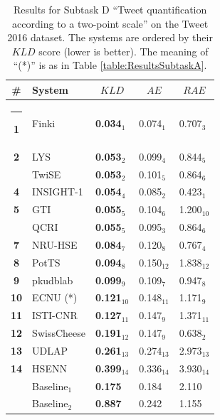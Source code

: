 \documentclass[11pt,letterpaper]{article}
\newif\ifdraft
\newcommand{\fabrizio}[1]{\ifdraft{\textcolor{cyan}{[Fabrizio]: {#1}}}\else{\vspace{0ex}}\fi}
\begin{document}
\begin{table}[tbh]
  \centering
  \begin{small}
    \renewcommand{\arraystretch}{1.0}%
    \resizebox{\columnwidth}{!} {
    \begin{tabular}{|c|l|l|l|l|}
      \hline\rule[0ex]{0mm}{2ex}
      \bf \# & \bf System & \multicolumn{1}{c|}{$KLD$} & \multicolumn{1}{c|}{$AE$} &\multicolumn{1}{c|}{$RAE$} \\
      \hline\rule[0ex]{-1mm}{2ex}
      \bf 1 & Finki & \bf 0.034$_{1}$ & 0.074$_{1}$ & 0.707$_{3}$ \\
      \bf 2 & LYS & \bf 0.053$_{2}$ & 0.099$_{4}$ & 0.844$_{5}$ \\
      & TwiSE & \bf 0.053$_{2}$ & 0.101$_{5}$ & 0.864$_{6}$ \\
      \bf 4 & INSIGHT-1 & \bf 0.054$_{4}$ & 0.085$_{2}$ & 0.423$_{1}$ \\
      \bf 5 & GTI & \bf 0.055$_{5}$ & 0.104$_{6}$ & 1.200$_{10}$ \\
      & QCRI & \bf 0.055$_{5}$ & 0.095$_{3}$ & 0.864$_{6}$ \\
      \bf 7 & NRU-HSE & \bf 0.084$_{7}$ & 0.120$_{8}$ & 0.767$_{4}$ \\
      \bf 8 & PotTS & \bf 0.094$_{8}$ & 0.150$_{12}$ & 1.838$_{12}$ \\
      \bf 9 & pkudblab & \bf 0.099$_{9}$ & 0.109$_{7}$ & 0.947$_{8}$ \\
      \bf 10 & ECNU (*) & \bf 0.121$_{10}$ & 0.148$_{11}$ & 1.171$_{9}$ \\
      \bf 11 & ISTI-CNR & \bf 0.127$_{11}$ & 0.147$_{9}$ & 1.371$_{11}$ \\
      \bf 12 & SwissCheese & \bf 0.191$_{12}$ & 0.147$_{9}$ & 0.638$_{2}$ \\
      \bf 13 & UDLAP & \bf 0.261$_{13}$ & 0.274$_{13}$ & 2.973$_{13}$ \\
      \bf 14 & HSENN & \bf 0.399$_{14}$ & 0.336$_{14}$ & 3.930$_{14}$ \\
      \hline\rule[0ex]{0mm}{2ex} 
      & Baseline$_1$ & \bf 0.175 & 0.184 & 2.110 \\
      & Baseline$_2$ & \bf 0.887 & 0.242 & 1.155 \\
      \hline
    \end{tabular}
    }
 \caption{\label{table:ResultsSubtaskD} Results for Subtask D ``Tweet quantification according to a two-point scale'' on the Tweet 2016 dataset. The systems are ordered by their $KLD$ score (lower is better). The meaning of ``(*)'' is as in Table \ref{table:ResultsSubtaskA}.
 }
\end{small}
\end{table}
\renewcommand{\baselinestretch}{1.00}
\end{document}
